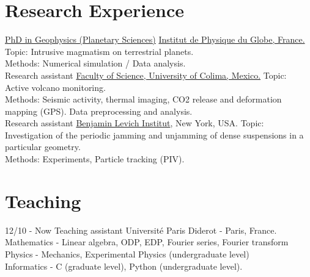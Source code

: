 \documentclass[]{friggeri-cv}
\begin{document}
\section{Research Experience}
\begin{entrylist}
    {\href{https://tel.archives-ouvertes.fr/tel-01278432}{PhD in  Geophysics (Planetary  Sciences)}}
  {\href{http://www.ipgp.fr/fr/pss/planetologie-sciences-spatiales}{Institut
      de Physique du Globe, France.}}
  {Topic: Intrusive magmatism on terrestrial planets. \\
    Methods: Numerical simulation /  Data analysis. \\}  {Research assistant} {\href{http://ciiv.ucol.mx/}{Faculty
      of Science, University of Colima, Mexico.}}
  {Topic: Active volcano monitoring. \\
    Methods:  Seismic  activity,  thermal  imaging,  CO2  release  and
    deformation  mapping (GPS).  Data  preprocessing and  analysis.\\}
        {Research      assistant}
  {\href{http://lisgi1.engr.ccny.cuny.edu/}{Benjamin Levich Institut},
    New York,  USA.}  {Topic:  Investigation of the  periodic jamming
    and unjamming of dense suspensions
    in a particular geometry.\\
    Methods: Experiments, Particle tracking (PIV).\\}
\end{entrylist}


\section{Teaching}
\begin{entrylist}
  \entry
    {12/10 - Now}
    {Teaching assistant}
    {Université Paris Diderot - Paris, France.}
    {Mathematics - Linear algebra, ODP, EDP, Fourier series, Fourier transform
    Physics - Mechanics, Experimental Physics (undergraduate level)\\
    Informatics - C (graduate level), Python (undergraduate level).\\}
\end{entrylist}
\end{document}
